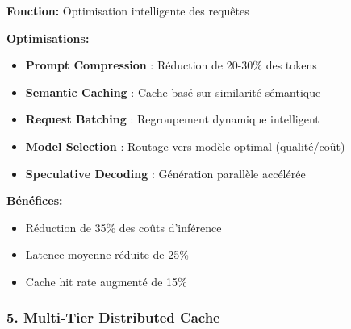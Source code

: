 \documentclass[12pt,a4paper]{article}
\begin{document}
\begin{tcolorbox}[colback=green!5,colframe=green!50!black,title=\textbf{Nouveau Composant: AI Request Optimizer}]

\textbf{Fonction:} Optimisation intelligente des requêtes

\textbf{Optimisations:}
\begin{itemize}[noitemsep]
    \item \textbf{Prompt Compression} : Réduction de 20-30\% des tokens
    \item \textbf{Semantic Caching} : Cache basé sur similarité sémantique
    \item \textbf{Request Batching} : Regroupement dynamique intelligent
    \item \textbf{Model Selection} : Routage vers modèle optimal (qualité/coût)
    \item \textbf{Speculative Decoding} : Génération parallèle accélérée
\end{itemize}

\textbf{Bénéfices:}
\begin{itemize}[noitemsep]
    \item Réduction de 35\% des coûts d'inférence
    \item Latence moyenne réduite de 25\%
    \item Cache hit rate augmenté de 15\%
\end{itemize}
\end{tcolorbox}

\subsubsection{5. Multi-Tier Distributed Cache}
\end{document}
